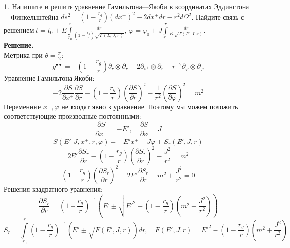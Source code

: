 \documentclass[12pt]{article}
\theoremstyle{definition}
\newtheorem{zad}{}[section]
\begin{document}
\begin{zad}
Напишите и решите уравнение Гамильтона—Якоби в координатах Эддингтона—Финкельштейна $ds^2=\left(1-\frac{r_g}{r}\right)(dx^+)^2 - 2 dx^+ dr - r^2d\Omega^2$. Найдите связь с решением $t=t_0\pm E\int\limits_{r_0}^r\frac{dr}{(1-\frac{r_g}{r})\sqrt{F(E,J,r)}}$, $\varphi=\varphi_0\pm J\int\limits_{r_0}^r\frac{dr}{r^2\sqrt{F(E,J,r)}}$.\\
\textbf{Решение.}\\
Метрика при $\theta=\frac{\pi}{2}$:
\begin{equation}
    g^{\bullet\bullet}=-\left(1-\frac{r_g}{r}\right)\partial_r\otimes\partial_r-2\partial_{x^+}\otimes\partial_r-r^{-2}\partial_\varphi\otimes\partial_\varphi
\end{equation}
Уравнение Гамильтона-Якоби:
\begin{equation}
    -2\frac{\partial S}{\partial x^+}\frac{\partial S}{\partial r}-\left(1-\frac{r_g}{r}\right)\left(\frac{\partial S}{\partial r}\right)^2-\frac{1}{r^2}\left(\frac{\partial S}{\partial\varphi}\right)^2=m^2
\end{equation}
Переменные $x^+,\varphi$ не входят явно в уравнение. Поэтому мы можем положить соответствующие производные постоянными:
\begin{equation}
    \frac{\partial S}{\partial x^+}=-E',\quad \frac{\partial S}{\partial\varphi}=J
\end{equation}
\begin{equation}
    S(E',J,x^+,r,\varphi)=-E'x^++J\varphi+S_r(E',J,r)
\end{equation}
\begin{equation}
    2E'\frac{\partial S_r}{\partial r}-\left(1-\frac{r_g}{r}\right)\left(\frac{\partial S_r}{\partial r}\right)^2-\frac{J^2}{r^2}=m^2
\end{equation}
\begin{equation}
    \left(1-\frac{r_g}{r}\right)\left(\frac{\partial S_r}{\partial r}\right)^2-2E'\frac{\partial S_r}{\partial r}+m^2+\frac{J^2}{r^2}=0
\end{equation}
Решения квадратного уравнения:
\begin{equation}
    \frac{\partial S_r}{\partial r}=\left(1-\frac{r_g}{r}\right)^{-1}\left(E'\pm\sqrt{E'^2-\left(1-\frac{r_g}{r}\right)\left(m^2+\frac{J^2}{r^2}\right)}\right)
\end{equation}
\begin{equation}
    S_r=\int\limits_{r_0}^r\left(1-\frac{r_g}{r}\right)^{-1}\left(E'\pm\sqrt{F(E',J,r)}\right)dr,\quad F(E',J,r)=E'^2-\left(1-\frac{r_g}{r}\right)\left(m^2+\frac{J^2}{r^2}\right)

\end{equation}
\end{zad}
\end{document}
